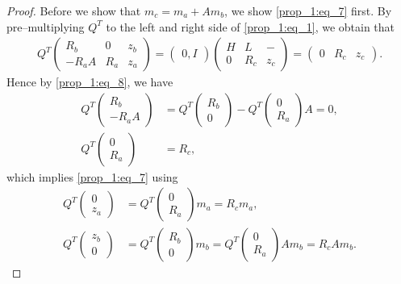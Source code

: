 \documentclass[microtype]{gtpart}     %
\theoremstyle{definition}
\begin{document}
\begin{proof}
	Before we show that $m_c = m_a + A m_b$, we show \cref{prop_1:eq_7} first.
	By pre--multiplying $Q^T$ to the left and right side of \cref{prop_1:eq_1}, we obtain that
	\begin{align}
		Q^T \begin{pmatrix}
		R_b &0 &z_b \\
		-R_aA &R_a &z_a
		\end{pmatrix} = \begin{pmatrix}
		0, I
		\end{pmatrix}\begin{pmatrix}
		H &L &-\\
		0 &R_c &z_c
		\end{pmatrix} = \begin{pmatrix} 0 &R_c &z_c \end{pmatrix}.
		\label{prop_1:eq_8}
	\end{align}
	Hence by \cref{prop_1:eq_8}, we have
	\begin{align*}
		Q^T\begin{pmatrix} R_b \\ -R_aA \end{pmatrix} &= 
		Q^T\begin{pmatrix} R_b \\ 0 \end{pmatrix} - Q^T\begin{pmatrix} 0 \\ R_a \end{pmatrix} A = 0, \\
		Q^T\begin{pmatrix} 0 \\ R_a \end{pmatrix} &= R_c,
	\end{align*}
	which implies \cref{prop_1:eq_7} using
	\begin{align*}
		Q^T\begin{pmatrix} 0 \\ z_a \end{pmatrix} &= Q^T\begin{pmatrix} 0 \\ R_a \end{pmatrix} m_a = R_c m_a, \\
		Q^T\begin{pmatrix} z_b \\ 0 \end{pmatrix} &= 
		Q^T\begin{pmatrix} R_b \\ 0 \end{pmatrix} m_b = Q^T\begin{pmatrix} 0 \\ R_a \end{pmatrix} A m_b =
		 R_c A m_b.
	\end{align*}
	

\end{proof}
\end{document}
